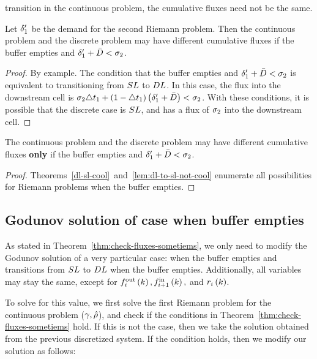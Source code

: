 transition in the continuous problem, the cumulative fluxes need not
be the same.
\begin{lem}
\label{lem:dl-to-sl-not-cool}Let $\delta_{1}'$
be the demand for the second Riemann problem. Then the continuous
problem and the discrete problem may have different cumulative fluxes
if the buffer empties and $\delta_{1}'+\bar{D}<\sigma_{2}$.\end{lem}
\begin{proof}
By example. The condition that the buffer empties and $\delta_{1}'+\bar{D}<\sigma_{2}$
is equivalent to transitioning from $SL$ to $DL$.
In this case, the flux into the downstream cell is $\sigma_{2}\triangle t_{1}+\left(1-\triangle t_{1}\right)\left(\delta_{1}'+\bar{D}\right)<\sigma_{2}$.
With these conditions, it is possible that the discrete case is $SL$,
and has a flux of $\sigma_{2}$ into the downstream
cell.\end{proof}
\begin{thm}
\label{thm:check-fluxes-sometiems}The continuous problem and the
discrete problem may have different cumulative fluxes \textbf{only}
if the buffer empties and $\delta_{1}'+\bar{D}<\sigma_{2}$.\end{thm}
\begin{proof}
Theorems~\ref{dl-sl-cool}~and~\ref{lem:dl-to-sl-not-cool} enumerate
all possibilities for Riemann problems when the buffer empties.
\end{proof}

\subsection{\label{sub:Godunov-solution-of}Godunov solution of case when buffer
empties}

As stated in Theorem~\ref{thm:check-fluxes-sometiems}, we only need
to modify the Godunov solution of a very particular case: when the
buffer empties and transitions from $SL$ to $DL$
when the buffer empties. Additionally, all variables may stay the
same, except for $f_{i}^{\text{out}}\left(k\right),f_{i+1}^{\text{in}}\left(k\right),$
and $r_{i}\left(k\right)$.

To solve for this value, we first solve the first Riemann problem
for the continuous problem ($\gamma,\hat{\rho}$),
and check if the conditions in Theorem~\ref{thm:check-fluxes-sometiems}
hold. If this is not the case, then we take the solution obtained
from the previous discretized system. If the condition holds, then
we modify our solution as follows:

